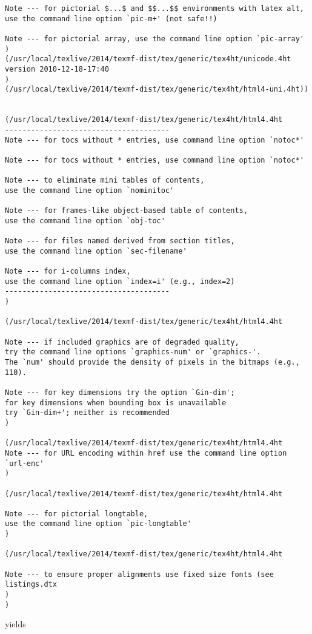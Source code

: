 \begin{Verbatim}[fontsize=\tiny]
Note --- for pictorial $...$ and $$...$$ environments with latex alt, 
use the command line option `pic-m+' (not safe!!)

Note --- for pictorial array, use the command line option `pic-array'
)
(/usr/local/texlive/2014/texmf-dist/tex/generic/tex4ht/unicode.4ht
version 2010-12-18-17:40
)
(/usr/local/texlive/2014/texmf-dist/tex/generic/tex4ht/html4-uni.4ht))


(/usr/local/texlive/2014/texmf-dist/tex/generic/tex4ht/html4.4ht
--------------------------------------
Note --- for tocs without * entries, use command line option `notoc*'

Note --- for tocs without * entries, use command line option `notoc*'

Note --- to eliminate mini tables of contents, 
use the command line option `nominitoc'

Note --- for frames-like object-based table of contents, 
use the command line option `obj-toc'

Note --- for files named derived from section titles, 
use the command line option `sec-filename'

Note --- for i-columns index, 
use the command line option `index=i' (e.g., index=2)
--------------------------------------
)

(/usr/local/texlive/2014/texmf-dist/tex/generic/tex4ht/html4.4ht

Note --- if included graphics are of degraded quality, 
try the command line options `graphics-num' or `graphics-'. 
The `num' should provide the density of pixels in the bitmaps (e.g., 110). 

Note --- for key dimensions try the option `Gin-dim'; 
for key dimensions when bounding box is unavailable 
try `Gin-dim+'; neither is recommended
)

(/usr/local/texlive/2014/texmf-dist/tex/generic/tex4ht/html4.4ht
Note --- for URL encoding within href use the command line option `url-enc'
)

(/usr/local/texlive/2014/texmf-dist/tex/generic/tex4ht/html4.4ht

Note --- for pictorial longtable, 
use the command line option `pic-longtable'
)

(/usr/local/texlive/2014/texmf-dist/tex/generic/tex4ht/html4.4ht

Note --- to ensure proper alignments use fixed size fonts (see listings.dtx
)
)
\end{Verbatim}

 yields 

